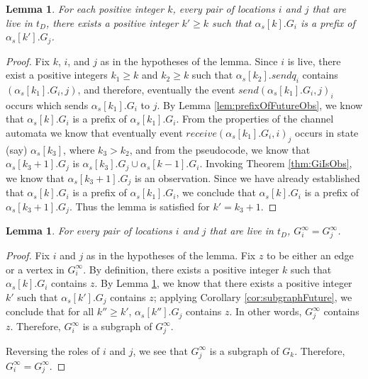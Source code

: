 \documentclass[11pt]{article}
\numberwithin{theorem}{section}
\newtheorem{lemma}[theorem]{Lemma}
\begin{document}
\begin{lemma}\label{lem:subgraphFutureLiveLocation}
For each positive integer $k$, every pair of locations $i$ and $j$
that are live in $t_D$, there exists a positive integer $k' \geq k$ such that
$\alpha_s[k].G_i$ is a prefix of $\alpha_s[k'].G_j$.
\end{lemma}

\begin{proof}
Fix $k$, $i$, and $j$ as in the hypotheses of the lemma.
Since $i$ is live, there exist a positive integers $k_1 \geq k$ and
$k_2 \geq k$ such that $\alpha_s[k_2].sendq_i$ contains
$(\alpha_s[k_1].G_i,j)$, and therefore, eventually the event
$send(\alpha_s[k_1].G_i,j)_i$ occurs which sends $\alpha_s[k_1].G_i$
to $j$. By Lemma \ref{lem:prefixOfFutureObs},
we know that
$\alpha_s[k].G_i$ is a prefix of $\alpha_s[k_1].G_i$. From the
properties of the channel automata we know that eventually event
$receive(\alpha_s[k_1].G_i,i)_j$ occurs in state (say)
$\alpha_s[k_3]$, where $k_3 > k_2$, and from the pseudocode, we know
that $\alpha_s[k_3+1].G_j$ is $\alpha_s[k_3].G_j \cup
\alpha_s[k-1].G_i$. Invoking Theorem \ref{thm:GiIsObs}, we know that $\alpha_s[k_3+1].G_j$ is an observation. 
Since we have already established that $\alpha_s[k].G_i$ is a prefix
of $\alpha_s[k_1].G_i$, we conclude that $\alpha_s[k].G_i$ is a
prefix of $\alpha_s[k_3+1].G_j$. Thus the lemma is satisfied for
$k' = k_3+1$.
\end{proof}

\begin{lemma}
\label{lem:limitGraphs}
For every pair of locations $i$ and $j$ that are live in $t_D$,
$G_i^\infty = G_j^\infty$.
\end{lemma}

\begin{proof}
Fix $i$ and $j$ as in the hypotheses of the lemma. Fix $z$ to be
either an edge or a vertex in $G_i^\infty$. By definition, there
exists a positive integer $k$ such that $\alpha_s[k].G_i$ contains
$z$. By Lemma \ref{lem:subgraphFutureLiveLocation}, we know that there
exists a positive integer $k'$ such that $\alpha_s[k'].G_j$ contains
$z$; applying Corollary \ref{cor:subgraphFuture}, we conclude that for
all $k'' \geq k'$, $\alpha_s[k''].G_j$ contains $z$. In other words,
$G_j^\infty$ contains $z$. Therefore, $G_i^\infty$ is a subgraph of 
$G_j^\infty$.

Reversing the roles of $i$ and $j$, we see that $G_j^\infty$ is a subgraph of
$G_k$. Therefore, $G_i^\infty = G_j^\infty$.
\end{proof}
\end{document}
